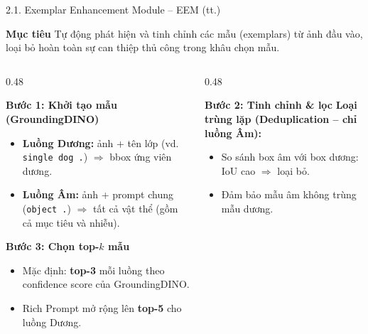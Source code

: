 \documentclass[11pt]{beamer}
\begin{document}
\begin{frame}[shrink=10]{2.1. Exemplar Enhancement Module -- EEM (tt.)}
\scriptsize

\begin{block}{\textbf{Mục tiêu}}
Tự động phát hiện và tinh chỉnh các mẫu (exemplars) từ ảnh đầu vào, loại bỏ hoàn toàn sự can thiệp thủ công trong khâu chọn mẫu.
\end{block}

\vspace{0.3em}

\begin{columns}[T,onlytextwidth]
\begin{column}{0.48\textwidth}

\begin{block}{\textbf{Bước 1: Khởi tạo mẫu (GroundingDINO)}}
\begin{itemize}
  \item \textbf{Luồng Dương:} ảnh + tên lớp (vd. \texttt{single dog .}) $\Rightarrow$ bbox ứng viên dương.
  \item \textbf{Luồng Âm:} ảnh + prompt chung (\texttt{object .}) $\Rightarrow$ tất cả vật thể (gồm cả mục tiêu và nhiễu).
\end{itemize}
\end{block}

\begin{block}{\textbf{Bước 3: Chọn top-$k$ mẫu}}
\begin{itemize}
  \item Mặc định: \textbf{top-3} mỗi luồng theo confidence score của GroundingDINO.
  \item Rich Prompt mở rộng lên \textbf{top-5} cho luồng Dương.
\end{itemize}
\end{block}

\end{column}

\begin{column}{0.48\textwidth}

\begin{block}{\textbf{Bước 2: Tinh chỉnh \& lọc}}
\textbf{Loại trùng lặp (Deduplication -- chỉ luồng Âm):}
\begin{itemize}
  \item So sánh box âm với box dương: IoU cao $\Rightarrow$ loại bỏ.
  \item Đảm bảo mẫu âm không trùng mẫu dương.
\end{itemize}


\end{block}
\end{column}
\end{columns}
\end{frame}
\end{document}
